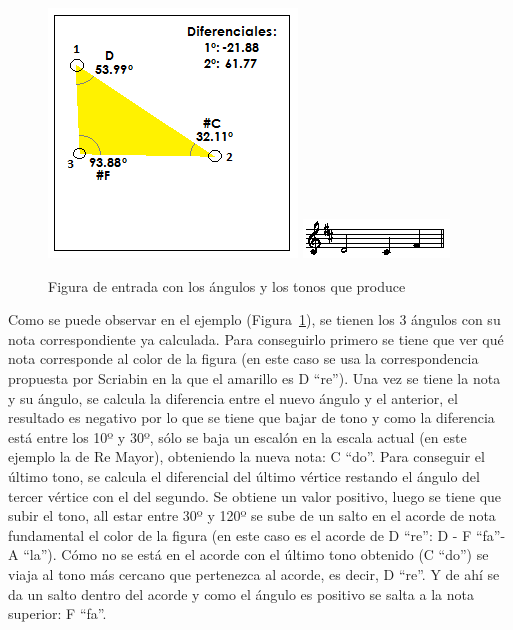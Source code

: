 		\begin{figure}[htbp]
		\centering
		\hspace*{0.0in}
		\includegraphics[scale=1.0]{graphics/simpletest1-F3.png}
		\includegraphics[scale=1.0]{graphics/simpletest1-MELpartitura.png}
		\caption{Figura de entrada con los ángulos y los tonos que produce}
		\label{fig:Figura4Voz1}
		\end{figure}

Como se puede observar en el ejemplo (Figura~\ref{fig:Figura4Voz1}), se tienen los 3 ángulos con su nota correspondiente ya calculada. Para conseguirlo primero se tiene que ver qué nota corresponde al color de la figura (en este caso se usa la correspondencia propuesta por Scriabin en la que el amarillo es D ``re''). Una vez se tiene la nota y su ángulo, se calcula la diferencia entre el nuevo ángulo y el anterior, el resultado es negativo por lo que se tiene que bajar de tono y como la diferencia está entre los 10º y 30º, sólo se baja un escalón en la escala actual (en este ejemplo la de Re Mayor), obteniendo la nueva nota: C ``do''. Para conseguir el último tono, se calcula el diferencial del último vértice restando el ángulo del tercer vértice con el del segundo. Se obtiene un valor positivo, luego se tiene que subir el tono, all estar entre 30º y 120º se sube de un salto en el acorde de nota fundamental el color de la figura (en este caso es el acorde de D ``re'': D - F ``fa''- A ``la''). Cómo no se está en el acorde con el último tono obtenido (C ``do'') se viaja al tono más cercano que pertenezca al acorde, es decir, D ``re''. Y de ahí se da un salto dentro del acorde y como el ángulo es positivo se salta a la nota superior: F ``fa''.

